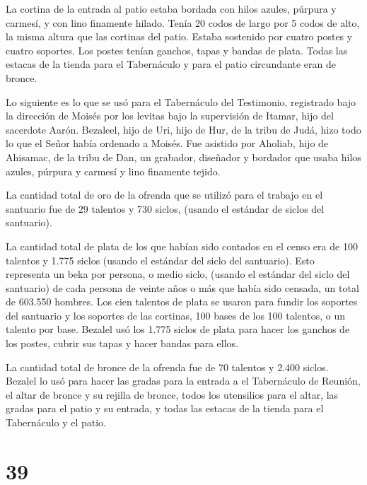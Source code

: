  La cortina de la entrada al patio estaba bordada con hilos
azules, púrpura y carmesí, y con lino finamente hilado. Tenía 20 codos
de largo por 5 codos de alto, la misma altura que las cortinas del
patio.  Estaba sostenido por cuatro postes y cuatro
soportes. Los postes tenían ganchos, tapas y bandas de plata.
 Todas las estacas de la tienda para el Tabernáculo y para
el patio circundante eran de bronce.

 Lo siguiente es lo que se usó para el Tabernáculo del
Testimonio, registrado bajo la dirección de Moisés por los levitas bajo
la supervisión de Itamar, hijo del sacerdote Aarón. 
Bezaleel, hijo de Uri, hijo de Hur, de la tribu de Judá, hizo todo lo
que el Señor había ordenado a Moisés.  Fue asistido por
Aholiab, hijo de Ahisamac, de la tribu de Dan, un grabador, diseñador y
bordador que usaba hilos azules, púrpura y carmesí y lino finamente
tejido.

 La cantidad total de oro de la ofrenda que se utilizó para
el trabajo en el santuario fue de 29 talentos y 730 siclos, (usando el
estándar de siclos del santuario).

 La cantidad total de plata de los que habían sido contados
en el censo era de 100 talentos y 1.775 siclos (usando el estándar del
siclo del santuario).  Esto representa un beka por persona,
o medio siclo, (usando el estándar del siclo del santuario) de cada
persona de veinte años o más que había sido censada, un total de 603.550
hombres.  Los cien talentos de plata se usaron para fundir
los soportes del santuario y los soportes de las cortinas, 100 bases de
los 100 talentos, o un talento por base.  Bezalel usó los
1.775 siclos de plata para hacer los ganchos de los postes, cubrir sus
tapas y hacer bandas para ellos.

 La cantidad total de bronce de la ofrenda fue de 70
talentos y 2.400 siclos.  Bezalel lo usó para hacer las
gradas para la entrada a el Tabernáculo de Reunión, el altar de bronce y
su rejilla de bronce, todos los utensilios para el altar, 
las gradas para el patio y su entrada, y todas las estacas de la tienda
para el Tabernáculo y el patio.

\hypertarget{section-38}{%
\section{39}\label{section-38}}

